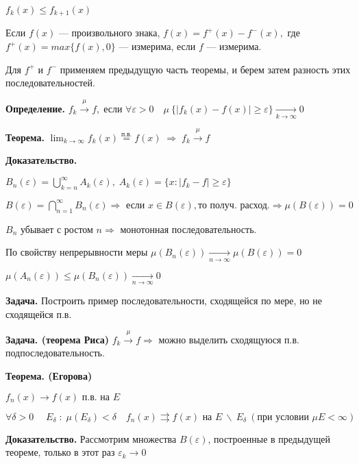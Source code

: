 $f_k(x) \leqslant f_{k+1}(x)$

Если $f(x)$ --- произвольного знака, $f(x) = f^{+}(x) - f^{-}(x),$
 где \\ $f^{+}(x) = max\{f(x), 0\}$ --- измерима, если $f$
--- измерима.

Для $f^+$ и $f^-$ применяем предыдущую часть теоремы, и берем
затем разность этих последовательностей.

\textbf{Определение.} \quad $ f_k \xrightarrow{  \mu   } f, \;
\mbox{если } \forall \varepsilon > 0 \quad \mu \: \{ | f_k(x) -
f(x) | \geqslant \varepsilon \}   \xrightarrow[k \rightarrow
\infty]{}   0$

\textbf{Теорема.} \quad $\lim_{k \rightarrow \infty} f_k(x)
\stackrel{\text{п.в.}}{=} f(x) \; \Rightarrow \; f_k \xrightarrow{
\mu   } f $

\textbf{Доказательство.} \quad

$B_n(\varepsilon) = \bigcup_{k = n}^{\infty} A_k(\varepsilon), \;
A_k(\varepsilon) = \{ x: |f_k - f | \geqslant \varepsilon\} $

$B (\varepsilon) = \bigcap_{n = 1}^\infty B_n(\varepsilon)
\Rightarrow \text{ если } x \in B(\varepsilon), \text{то получ.
расход.} \Rightarrow \mu(B(\varepsilon)) = 0 $

$B_n$ убывает с ростом $n \Rightarrow$ монотонная
последовательность.

По свойству непрерывности меры $\mu (B_n(\varepsilon))
\xrightarrow[n \rightarrow \infty]{} \mu(B(\varepsilon)) = 0$

$\mu (A_n(\varepsilon)) \leqslant \mu(B_n(\varepsilon))
\xrightarrow[n \rightarrow \infty]{} 0$

\textbf{Задача.} \quad Построить пример последовательности,
сходящейся по мере, но не сходящейся п.в.

\textbf{Задача. (теорема Риса)} \quad $f_k \xrightarrow{\mu} f
\Rightarrow $ можно выделить сходящуюся п.в.
подпоследовательность.


\textbf{Теорема. (Егорова) } \quad

$f_n(x) \rightarrow f(x) \text{ п.в. на } E$

$\forall \delta > 0 \quad \; E_\delta \; : \; \mu(E_\delta) <
\delta \quad f_n (x) \rightrightarrows f(x) \text{ на } E \:
\backslash \: E_\delta \:(\text{при условии } \mu E < \infty)$

\textbf{Доказательство.} \quad Рассмотрим множества $B
(\varepsilon)$, построенные в предыдущей теореме, только в этот
раз $\varepsilon_{k} \rightarrow 0$


